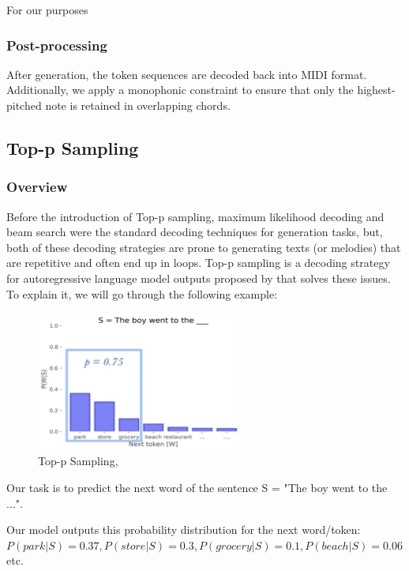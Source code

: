 \documentclass[a4paper,12pt]{extarticle}
\begin{document}
For our purposes

\subsubsection{Post-processing}
After generation, the token sequences are decoded back into MIDI format. Additionally, we apply a monophonic constraint to ensure that only the highest-pitched note is retained in overlapping chords.


\subsection{Top-p Sampling}
\label{sec:6_9}
\subsubsection{Overview}

Before the introduction of Top-p sampling, maximum likelihood decoding and beam search were the standard decoding techniques for generation tasks, but, both of these decoding strategies are prone to generating texts (or melodies) that are repetitive and often end up in loops. Top-p sampling is a decoding strategy for autoregressive language model outputs proposed by \textcite{holtzman2020curiouscaseneuraltext} that solves these issues. To explain it, we will go through the following example:

\begin{figure}[H] %
    \centering
    \includegraphics[width=0.6\textwidth]{top p.png} %
    \caption{Top-p Sampling, \textcite{TopPWebsite}}
    \label{fig:topp}
\end{figure}

Our task is to predict the next word of the sentence S = "The boy went to the ...".

Our model outputs this probability distribution for the next word/token:
$P(park|S) = 0.37, P(store|S) = 0.3, P(grocery|S) = 0.1, P(beach|S) = 0.06$ etc. \newline
\end{document}
